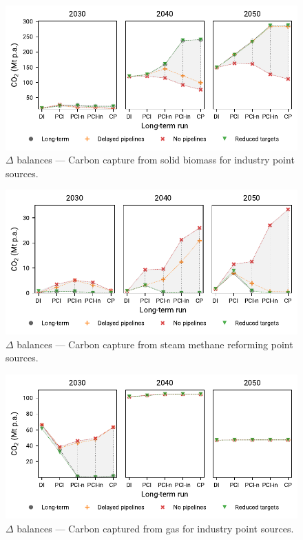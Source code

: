 \documentclass[preprint,12pt,sort&compress]{elsarticle}
\begin{document}
\begin{figure}[htbp]
  \centering
  \includegraphics[width=\textwidth]{delta_balances_solid biomass for industry CC}
  \caption{$\Delta$ balances --- Carbon capture from solid biomass for industry point sources.}
  \label{fig:delta_balances_biomass_industry_cc}
\end{figure}

\begin{figure}[htbp]
  \centering
  \includegraphics[width=\textwidth]{delta_balances_SMR CC}
  \caption{$\Delta$ balances --- Carbon capture from steam methane reforming point sources.}
  \label{fig:delta_balances_smr_cc}
\end{figure}

\begin{figure}[htbp]
  \centering
  \includegraphics[width=\textwidth]{delta_balances_gas for industry CC}
  \caption{$\Delta$ balances --- Carbon captured from gas for industry point sources.}
  \label{fig:delta_balances_gas_for_industry}
\end{figure}
\end{document}
